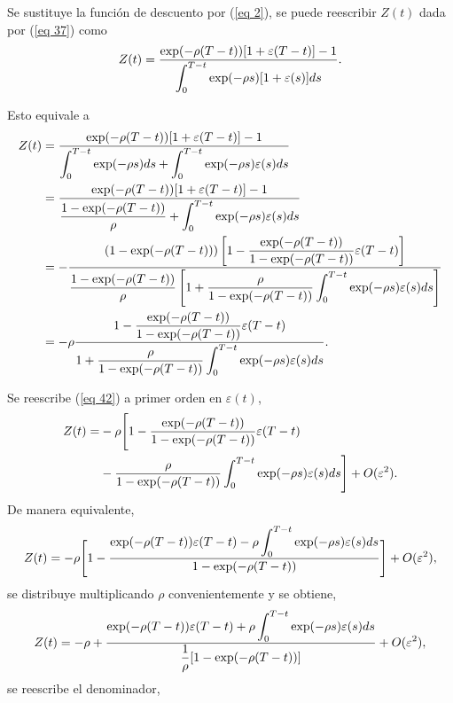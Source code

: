 Se sustituye la función de descuento por (\ref{eq 2}), se puede reescribir $Z(t)$ dada por (\ref{eq 37}) como
\begin{equation}
\label{eq 41}
    Z(t)=\dfrac{\exp(-\rho (T-t))[1+ \varepsilon(T-t)]-1}{\displaystyle \int_0^{T-t} \exp (- \rho s) [1+\varepsilon(s)] ds}.
\end{equation}

\noindent Esto equivale a
\begin{align}
\label{eq 42}
  Z(t)&=\dfrac{\exp(-\rho (T-t))[1+ \varepsilon(T-t)]-1}{\displaystyle \int_0^{T-t} \exp (- \rho s)  ds+\displaystyle \int_0^{T-t} \exp (- \rho s) \varepsilon(s) ds} \nonumber \\ 
  &=\dfrac{\exp(-\rho (T-t))[1+ \varepsilon(T-t)]-1}{\dfrac{1-\exp (- \rho (T-t))}{\rho}+\displaystyle \int_0^{T-t} \exp (- \rho s) \varepsilon(s) ds} \nonumber \\ 
  &=- \dfrac{(1-\exp(-\rho (T-t))) \left[ 1- \dfrac{\exp(-\rho (T-t))}{1-\exp(-\rho (T-t))} \varepsilon(T-t)\right]}{\dfrac{1-\exp (- \rho (T-t))}{\rho} \left[1+ \dfrac{\rho}{1-\exp (- \rho (T-t))}\displaystyle \int_0^{T-t} \exp (- \rho s) \varepsilon(s) ds \right]}  \nonumber \\ 
  &=- \rho \dfrac{1- \dfrac{\exp(-\rho (T-t))}{1-\exp(-\rho (T-t))} \varepsilon(T-t)}{1+ \dfrac{\rho}{1-\exp (- \rho (T-t))}\displaystyle \int_0^{T-t} \exp (- \rho s) \varepsilon(s) ds} .
  \end{align}


\noindent Se reescribe (\ref{eq 42}) a primer orden en $\varepsilon(t)$, \begin{equation*}
\begin{split}
Z(t)= &- \rho \Biggr[1- \dfrac{\exp (-\rho (T-t))}{1-\exp (-\rho (T-t))} \varepsilon(T-t) \\
&- \dfrac{\rho}{1-\exp (-\rho (T-t))} \displaystyle \int_0^{T-t} \exp (- \rho s) \varepsilon(s) ds \Biggr] + O(\varepsilon^2).
\end{split}
\end{equation*}
De manera equivalente,
\begin{equation*}
\begin{split}
Z(t)=- \rho \Biggr[1- \dfrac{\exp (-\rho (T-t)) \varepsilon(T-t) - \rho \displaystyle \int_0^{T-t} \exp (- \rho s) \varepsilon(s) ds}{1-\exp (-\rho (T-t))}   \Biggr] + O(\varepsilon^2),
\end{split}
\end{equation*}
se distribuye multiplicando $\rho$ convenientemente y se obtiene,
$$Z(t)=- \rho + \dfrac{\exp (-\rho (T-t)) \varepsilon(T-t) + \rho \displaystyle \int_0^{T-t} \exp (- \rho s) \varepsilon(s) ds}{\dfrac{1}{\rho}[1-\exp (-\rho (T-t))]} + O(\varepsilon^2),   $$
se reescribe el denominador,

